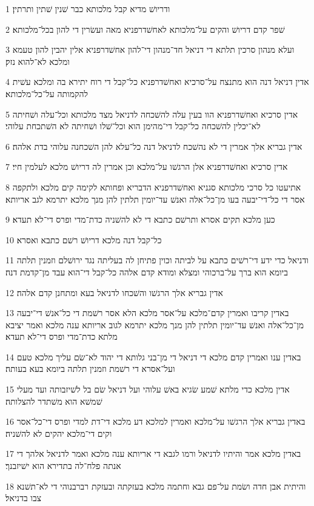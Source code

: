 \par 1 ודריושׁ מדיא קבל מלכותא כבר שׁנין שׁתין ותרתין׃
\par 2 שׁפר קדם דריושׁ והקים על־מלכותא לאחשׁדרפניא מאה ועשׂרין די להון בכל־מלכותא׃
\par 3 ועלא מנהון סרכין תלתא די דניאל חד־מנהון די־להון אחשׁדרפניא אלין יהבין להון טעמא ומלכא לא־להוא נזק׃
\par 4 אדין דניאל דנה הוא מתנצח על־סרכיא ואחשׁדרפניא כל־קבל די רוח יתירא בה ומלכא עשׁית להקמותה על־כל־מלכותא׃
\par 5 אדין סרכיא ואחשׁדרפניא הוו בעין עלה להשׁכחה לדניאל מצד מלכותא וכל־עלה ושׁחיתה לא־יכלין להשׁכחה כל־קבל די־מהימן הוא וכל־שׁלו ושׁחיתה לא השׁתכחת עלוהי׃
\par 6 אדין גבריא אלך אמרין די לא נהשׁכח לדניאל דנה כל־עלא להן השׁכחנה עלוהי בדת אלהה׃
\par 7 אדין סרכיא ואחשׁדרפניא אלן הרגשׁו על־מלכא וכן אמרין לה דריושׁ מלכא לעלמין חיי׃
\par 8 אתיעטו כל סרכי מלכותא סגניא ואחשׁדרפניא הדבריא ופחותא לקימה קים מלכא ולתקפה אסר די כל־די־יבעה בעו מן־כל־אלה ואנשׁ עד־יומין תלתין להן מנך מלכא יתרמא לגב אריותא׃
\par 9 כען מלכא תקים אסרא ותרשׁם כתבא די לא להשׁניה כדת־מדי ופרס די־לא תעדא׃
\par 10 כל־קבל דנה מלכא דריושׁ רשׁם כתבא ואסרא׃
\par 11 ודניאל כדי ידע די־רשׁים כתבא על לביתה וכוין פתיחן לה בעליתה נגד ירושׁלם וזמנין תלתה ביומא הוא ברך על־ברכוהי ומצלא ומודא קדם אלהה כל־קבל די־הוא עבד מן־קדמת דנה׃
\par 12 אדין גבריא אלך הרגשׁו והשׁכחו לדניאל בעא ומתחנן קדם אלהה׃
\par 13 באדין קריבו ואמרין קדם־מלכא על־אסר מלכא הלא אסר רשׁמת די כל־אנשׁ די־יבעה מן־כל־אלה ואנשׁ עד־יומין תלתין להן מנך מלכא יתרמא לגוב אריותא ענה מלכא ואמר יציבא מלתא כדת־מדי ופרס די־לא תעדא׃
\par 14 באדין ענו ואמרין קדם מלכא די דניאל די מן־בני גלותא די יהוד לא־שׂם עליך מלכא טעם ועל־אסרא די רשׁמת וזמנין תלתה ביומא בעא בעותה׃
\par 15 אדין מלכא כדי מלתא שׁמע שׂגיא באשׁ עלוהי ועל דניאל שׂם בל לשׁיזבותה ועד מעלי שׁמשׁא הוא משׁתדר להצלותה׃
\par 16 באדין גבריא אלך הרגשׁו על־מלכא ואמרין למלכא דע מלכא די־דת למדי ופרס די־כל־אסר וקים די־מלכא יהקים לא להשׁניה׃
\par 17 באדין מלכא אמר והיתיו לדניאל ורמו לגבא די אריותא ענה מלכא ואמר לדניאל אלהך די אנתה פלח־לה בתדירא הוא ישׁיזבנך׃
\par 18 והיתית אבן חדה ושׂמת על־פם גבא וחתמה מלכא בעזקתה ובעזקת רברבנוהי די לא־תשׁנא צבו בדניאל׃
